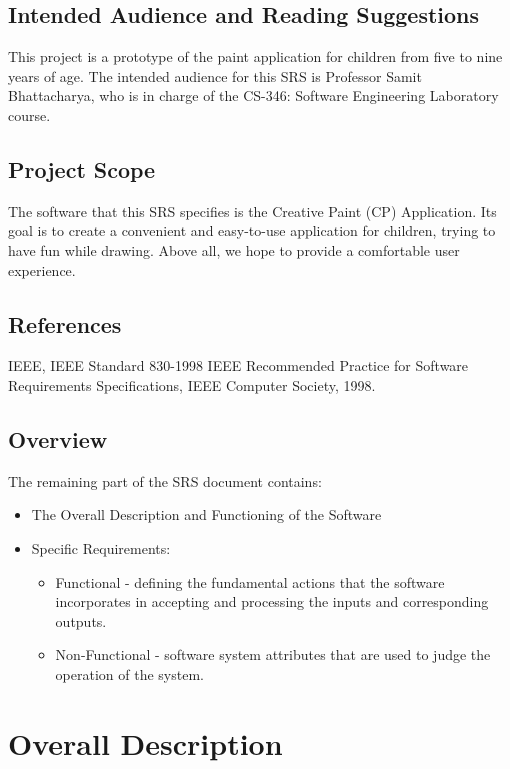 \documentclass{scrreprt}
\begin{document}
\section{Intended Audience and Reading Suggestions}
This project is a prototype of the paint application for children from five to nine years of age. The intended audience for this SRS is Professor Samit Bhattacharya, who is in charge of the CS-346: Software Engineering Laboratory course. 

\section{Project Scope}
The software that this SRS specifies is the Creative Paint (CP) Application. Its goal is to create a convenient and easy-to-use application for children, trying to have fun while drawing. Above all, we hope to provide a comfortable user experience.

\section{References}
IEEE, IEEE Standard 830-1998 IEEE Recommended Practice for Software Requirements Specifications, IEEE Computer Society, 1998.

\section{Overview}
The remaining part of the SRS document contains:
\begin{itemize}[itemsep=0.5pt]
    \item The Overall Description and Functioning of the Software
    \item Specific Requirements:
        \begin{itemize}[itemsep=0.5pt]
            \item Functional - defining the fundamental actions that the software incorporates in accepting and processing the inputs and corresponding outputs.
            \item Non-Functional - software system attributes that are used
            to judge the operation of the system.
        \end{itemize}
\end{itemize}

\chapter{Overall Description}
\end{document}
